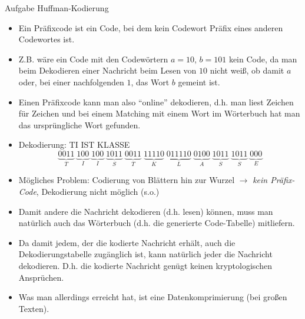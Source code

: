 \begin{frame}[allowframebreaks]{Aufgabe \thesection}{Huffman-Kodierung}
  \begin{Sidenote}
    \begin{itemize}
      \item Ein Präfixcode ist ein Code, bei dem kein Codewort Präfix eines anderen Codewortes ist. 
      \item Z.B. wäre ein Code mit den Codewörtern $a = 10$, $b = 101$ kein Code, da man beim Dekodieren einer Nachricht beim
      Lesen von $10$ nicht weiß, ob damit $a$ oder, bei einer nachfolgenden $1$, das Wort $b$ gemeint ist. 
      \item Einen Präfixcode kann man also \enquote{online} dekodieren, d.h. man liest Zeichen für Zeichen und bei einem Matching mit einem Wort im Wörterbuch hat man das ursprüngliche Wort gefunden.
    \end{itemize}
  \end{Sidenote}
  \begin{solution}
    \begin{itemize}
      \item \alert{Dekodierung:} TI IST KLASSE
        \[
          \underbrace{0011}_{T}\;\underbrace{100}_{I}\;\underbrace{100}_{I}\;\underbrace{1011}_{S}\;\underbrace{0011}_{T}\;\underbrace{11110}_{K}\;\underbrace{011110}_{L}\;\underbrace{0100}_{A}\;\underbrace{1011}_{S}\;\underbrace{1011}_{S}\;\underbrace{000}_{E}
        \]
      \item \alert{Mögliches Problem:} Codierung von Blättern hin zur Wurzel $\rightarrow$ \textit{kein Präfix-Code}, Dekodierung nicht möglich (s.o.)
    \end{itemize}
  \end{solution}
  \begin{solution}
    \begin{itemize}
      \item Damit andere die Nachricht dekodieren (d.h. lesen) können, muss man natürlich auch das Wörterbuch (d.h. die generierte Code-Tabelle) mitliefern. 
      \item Da damit jedem, der die kodierte Nachricht erhält, auch die Dekodierungstabelle zugänglich ist, kann natürlich jeder die Nachricht dekodieren. D.h. die kodierte Nachricht genügt keinen kryptologischen Ansprüchen. 
      \item Was man allerdings erreicht hat, ist eine Datenkomprimierung (bei großen Texten).
    \end{itemize}
  \end{solution}
\end{frame}
